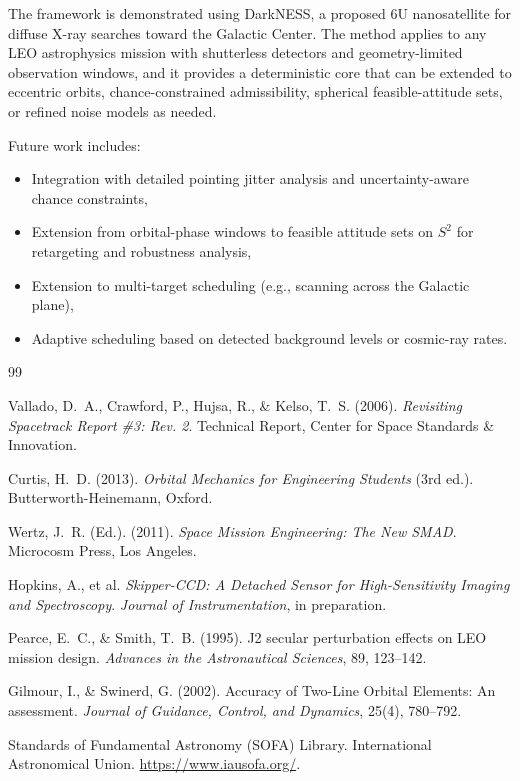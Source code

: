 \documentclass[preprint,12pt]{elsarticle}
\theoremstyle{definition}
\theoremstyle{remark}
\begin{document}
The framework is demonstrated using DarkNESS, a proposed 6U nanosatellite for diffuse X-ray searches toward the Galactic Center.
The method applies to any LEO astrophysics mission with shutterless detectors and geometry-limited observation windows, and it provides a deterministic core that can be extended to eccentric orbits, chance-constrained admissibility, spherical feasible-attitude sets, or refined noise models as needed.

Future work includes:
\begin{itemize}
\item Integration with detailed pointing jitter analysis and uncertainty-aware chance constraints,
\item Extension from orbital-phase windows to feasible attitude sets on $S^2$ for retargeting and robustness analysis,
\item Extension to multi-target scheduling (e.g., scanning across the Galactic plane),
\item Adaptive scheduling based on detected background levels or cosmic-ray rates.
\end{itemize}

\begin{thebibliography}{99}

Vallado, D.~A., Crawford, P., Hujsa, R., \& Kelso, T.~S. (2006).
\textit{Revisiting Spacetrack Report \#3: Rev. 2}.
Technical Report, Center for Space Standards \& Innovation.

Curtis, H.~D. (2013).
\textit{Orbital Mechanics for Engineering Students} (3rd ed.).
Butterworth-Heinemann, Oxford.

Wertz, J.~R. (Ed.). (2011).
\textit{Space Mission Engineering: The New SMAD}.
Microcosm Press, Los Angeles.

Hopkins, A., et al.
\textit{Skipper-CCD: A Detached Sensor for High-Sensitivity Imaging and Spectroscopy}.
\textit{Journal of Instrumentation}, in preparation.

Pearce, E.~C., \& Smith, T.~B. (1995).
J2 secular perturbation effects on LEO mission design.
\textit{Advances in the Astronautical Sciences}, 89, 123--142.

Gilmour, I., \& Swinerd, G. (2002).
Accuracy of Two-Line Orbital Elements: An assessment.
\textit{Journal of Guidance, Control, and Dynamics}, 25(4), 780--792.

Standards of Fundamental Astronomy (SOFA) Library.
International Astronomical Union. \url{https://www.iausofa.org/}.

\end{thebibliography}
\end{document}
